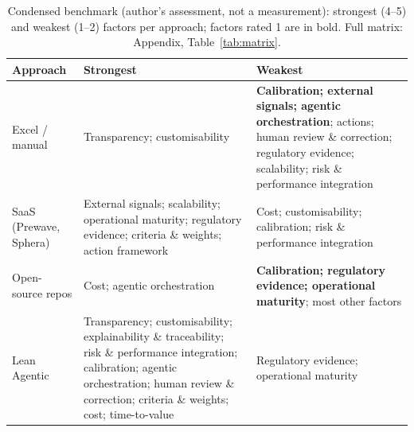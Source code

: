 \documentclass[10pt,twocolumn,a4paper]{article}
\newcommand{\dimhead}[1]{\textbf{#1}}
\begin{document}
\begin{table}[t]
  \caption{Condensed benchmark (author's assessment, not a measurement): strongest (4--5)
  and weakest (1--2) factors per approach; factors rated 1 are in bold. Full matrix:
  Appendix, Table~\ref{tab:matrix}.}
  \label{tab:condensed}
  \small
  \begin{tabular}{@{}P{0.20\columnwidth}P{0.36\columnwidth}P{0.32\columnwidth}@{}}
    \toprule
    \dimhead{Approach} & \dimhead{Strongest} & \dimhead{Weakest} \\
    \midrule
    Excel / manual & Transparency; customisability & \textbf{Calibration; external signals; agentic orchestration}; actions; human review \& correction; regulatory evidence; scalability; risk \& performance integration \\
    SaaS (Prewave, Sphera) & External signals; scalability; operational maturity; regulatory evidence; criteria \& weights; action framework & Cost; customisability; calibration; risk \& performance integration \\
    Open-source repos & Cost; agentic orchestration & \textbf{Calibration; regulatory evidence; operational maturity}; most other factors \\
    Lean Agentic & Transparency; customisability; explainability \& traceability; risk \& performance integration; calibration; agentic orchestration; human review \& correction; criteria \& weights; cost; time-to-value & Regulatory evidence; operational maturity \\
    \bottomrule
  \end{tabular}
\end{table}
\end{document}
